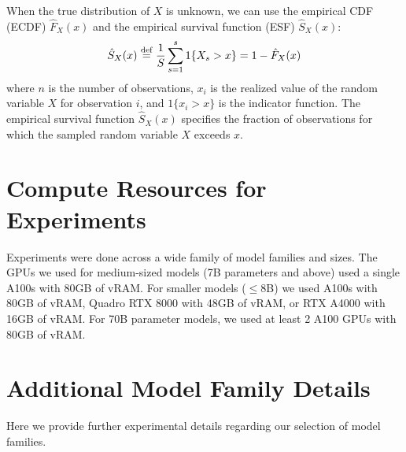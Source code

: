 When the true distribution of $X$ is unknown, we can use the empirical CDF (ECDF) $\hat{F}_X(x)$ and the empirical survival function (ESF) $\hat{S}_X(x)$:
\begin{equation}
\hat{S}_X(x) \operatorname{\stackrel{\text{def}}{\;=\;}} \frac{1}{S} \sum_{s=1}^{s} 1\{X_s > x\} = 1 - \hat{F}_X(x)
\end{equation}
where $n$ is the number of observations, 
$x_i$ is the realized value of the random variable $X$ for observation $i$, 
and $1\{x_i > x\}$ is the indicator function.
The empirical survival function $\hat{S}_X(x)$ specifies the fraction of observations for which the sampled random variable $X$ exceeds $x$.

\section{Compute Resources for Experiments} 
Experiments were done across a wide family of model families and sizes. 
The GPUs we used for medium-sized models (7B parameters and above) used a single A100s with 80GB of vRAM.
For smaller models ($\leq$8B) we used A100s with 80GB of vRAM, 
Quadro RTX 8000 with 48GB of vRAM, or 
RTX A4000 with 16GB of vRAM. 
For 70B parameter models, we used at least 2 A100 GPUs with 80GB of vRAM.

\section{Additional Model Family Details}
\label{app:sec:ckpt-details}

Here we provide further experimental details regarding our selection of model families. 

